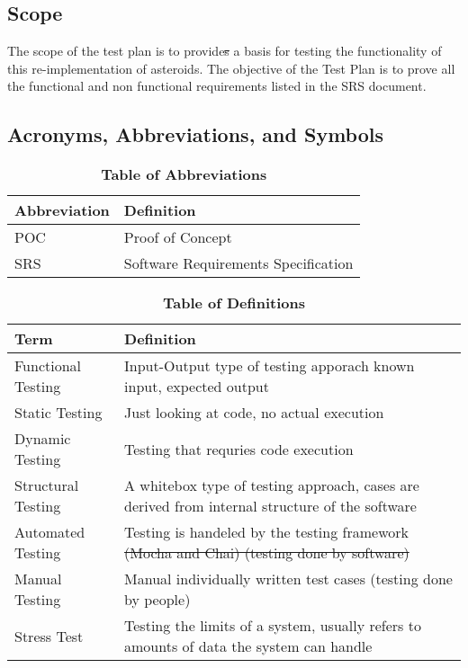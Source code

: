 \documentclass[12pt, titlepage]{article}
\begin{document}
\subsection{Scope}
The scope of the test plan is to provide\sout{s} a basis for testing the functionality of this re-implementation of asteroids. The objective of the Test Plan is to prove all the functional and non functional requirements listed in the SRS document.

\subsection{Acronyms, Abbreviations, and Symbols}

\begin{table}[hbp]
\caption{\textbf{Table of Abbreviations}} \label{Table}

\begin{tabularx}{\textwidth}{p{3cm}X}
\toprule
\textbf{Abbreviation} & \textbf{Definition} \\
\midrule
POC & Proof of Concept\\
SRS & Software Requirements Specification\\
\bottomrule
\end{tabularx}

\end{table}

\begin{table}[!htbp]
\caption{\textbf{Table of Definitions}} \label{Table}

\begin{tabularx}{\textwidth}{p{3cm}X}
\toprule
\textbf{Term} & \textbf{Definition}\\
\midrule
Functional Testing & Input-Output type of testing apporach known input, expected output\\
Static Testing & Just looking at code, no actual execution\\
Dynamic Testing & Testing that requries code execution\\
Structural Testing & A whitebox type of testing approach, cases are derived from internal structure of the software\\
Automated Testing & Testing is handeled by the testing framework \sout{(Mocha and Chai) (testing done by software)}\\
Manual Testing & Manual individually written test cases (testing done by people)\\
Stress Test & Testing the limits of a system, usually refers to amounts of data the system can handle\\
\bottomrule
\end{tabularx}

\end{table}
\end{document}
